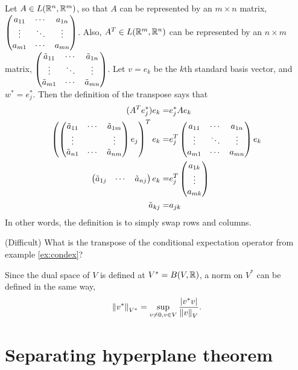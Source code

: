 \begin{example}
  Let $A \in L(\mathbb{R}^n, \mathbb{R}^m)$, so that $A$ can be represented by an $m
  \times n$ matrix, $\begin{pmatrix} {a}_{11} & \cdots & {a}_{1n} \\ \vdots & \ddots & \vdots \\ {a}_{m1} & \cdots & {a}_{mn} \end{pmatrix}$. Also, $A^T \in L(\mathbb{R}^m, \mathbb{R}^n)$ can
  be represented by an $n \times m$ matrix, $\begin{pmatrix} {\tilde{a}}_{11} & \cdots & {\tilde{a}}_{1n} \\ \vdots & \ddots & \vdots \\ {\tilde{a}}_{m1} & \cdots & {\tilde{a}}_{mn} \end{pmatrix}$. Let
  $v = e_k$ be the $k$th standard basis vector, and $w^\ast =
  e_j^\ast$. Then the definition of the transpose says that
  \begin{align*}
    (A^T e_j^\ast) e_k = & e_j^\ast A e_k  \\
    \left(\begin{pmatrix} \tilde{a}_{11} & \cdots & \tilde{a}_{1m} \\
        \vdots & & \vdots \\
        \tilde{a}_{n1} & \cdots & \tilde{a}_{nm} \end{pmatrix}  e_j\right)^T e_k = & e_j^T \begin{pmatrix} {a}_{11} & \cdots & {a}_{1n} \\ \vdots & \ddots & \vdots \\ {a}_{m1} & \cdots & {a}_{mn} \end{pmatrix}
                                                                                     e_k \\
    \begin{pmatrix} \tilde{a}_{1j} & \cdots &  \tilde{a}_{nj}
    \end{pmatrix} e_k  = & e_j^T \begin{pmatrix} a_{1k} \\ \vdots \\  a_{mk}
    \end{pmatrix} \\
    \tilde{a}_{kj} = & a_{jk}
  \end{align*}
  In other words, the definition is to simply swap rows and columns.  
\end{example}
\begin{exercise}(Difficult) What is the transpose of the conditional
  expectation operator from example \ref{ex:condex}?
\end{exercise}
Since the dual space of $V$ is defined at $V^* = B(V,\mathbb{R})$, a norm on
$V^*$ can be defined in the same way, 
\[ \left\Vert {v^*} \right\Vert_{V^*} = \sup_{v \neq 0, v \in V}
\frac{\left\vert {v^*v} \right\vert}{\left\Vert {v} \right\Vert_V}. \]

\section{Separating hyperplane theorem}

